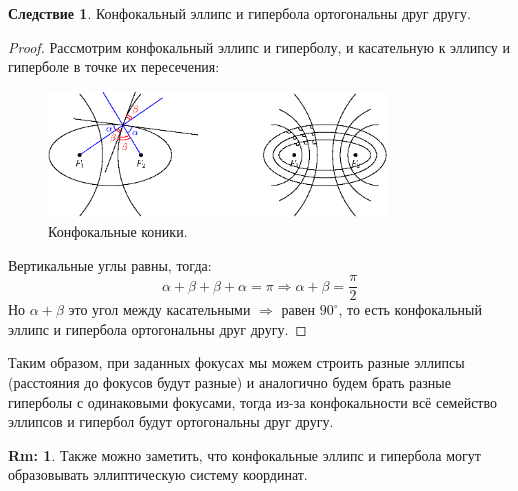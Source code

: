 \documentclass[12pt]{article}
\theoremstyle{definition}
\newtheorem{rem}{Rm:}
\newtheorem{corollary}{Следствие}
\begin{document}
\begin{corollary}
	Конфокальный эллипс и гипербола ортогональны друг другу.
\end{corollary}
\begin{proof}
	Рассмотрим конфокальный эллипс и гиперболу, и касательную к эллипсу и гиперболе в точке их пересечения:
	\begin{figure}[H]
		\centering
		\includegraphics[width=0.8\textwidth]{ANGL1_20.eps}
		\caption{Конфокальные коники.}
		\label{1_20}
	\end{figure}
	Вертикальные углы равны, тогда:
	$$
		\alpha + \beta + \beta + \alpha = \pi \Rightarrow \alpha + \beta = \dfrac{\pi}{2}
	$$
	Но $\alpha + \beta$ это угол между касательными $\Rightarrow$ равен $90^\circ$, то есть конфокальный эллипс и гипербола ортогональны друг другу.
\end{proof}
Таким образом, при заданных фокусах мы можем строить разные эллипсы (расстояния до фокусов будут разные) и аналогично будем брать разные гиперболы с одинаковыми фокусами, тогда из-за конфокальности всё семейство эллипсов и гипербол будут ортогональны друг другу.

\begin{rem}
	Также можно заметить, что конфокальные эллипс и гипербола могут образовывать эллиптическую систему координат.
\end{rem}
\end{document}
